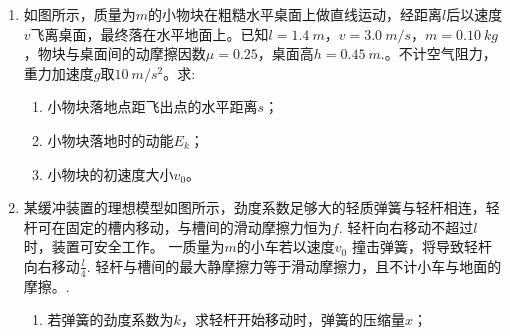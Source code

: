 \begin{enumerate}[leftmargin=0em]
{\begin{enumerate}
\end{enumerate}


}


\newpage
\item 
{}
如图所示，质量为$ m $的小物块在粗糙水平桌面上做直线运动，经距离$ l $后以速度$ v $飞离桌面，最终落在水平地面上。已知$ l=1.4\ m $，$ v=3.0 \ m/s $，$ m=0.10 \ kg $，物块与桌面间的动摩擦因数$ \mu =0.25 $，桌面高$ h=0.45\ m $.。不计空气阻力，重力加速度$ g $取$ 10 \ m/s^{2} $。求:
\begin{enumerate}
\renewcommand{\labelenumii}{(\arabic{enumii})}
\item 
小物块落地点距飞出点的水平距离$ s $；


\item 
小物块落地时的动能$ E_{k} $；


\item 
小物块的初速度大小$ v_{0} $。

\end{enumerate}
\begin{figure}[h!]
\flushright

\end{figure}






\item
{}
某缓冲装置的理想模型如图所示，劲度系数足够大的轻质弹簧与轻杆相连，轻杆可在固定的槽内移动，与槽间的滑动摩擦力恒为$ f $. 轻杆向右移动不超过$ l $ 时，装置可安全工作。 一质量为$ m $的小车若以速度$ v_{0} $ 撞击弹簧，将导致轻杆向右移动$ \frac{l}{4} $. 轻杆与槽间的最大静摩擦力等于滑动摩擦力，且不计小车与地面的摩擦。. 
\begin{enumerate}
\renewcommand{\labelenumii}{(\arabic{enumii})}
\item 
若弹簧的劲度系数为$ k $，求轻杆开始移动时，弹簧的压缩量$ x $； 



\end{enumerate}
\end{enumerate}
